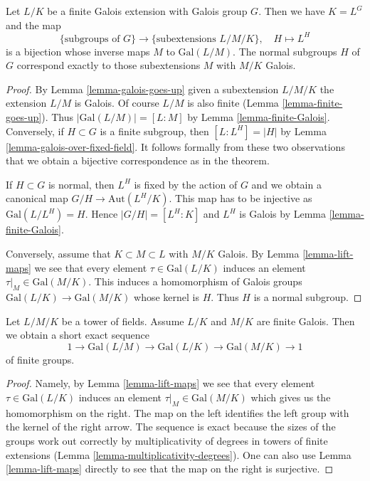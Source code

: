 \begin{theorem}
\label{theorem-galois-theory}
Let $L/K$ be a finite Galois extension with Galois group $G$.
Then we have $K = L^G$ and the map
$$
\{\text{subgroups of }G\}
\longrightarrow
\{\text{subextensions }L/M/K\},\quad
H \longmapsto L^H
$$
is a bijection whose inverse maps $M$ to $\text{Gal}(L/M)$.
The normal subgroups $H$ of $G$ correspond exactly to those
subextensions $M$ with $M/K$ Galois.
\end{theorem}

\begin{proof}
By Lemma \ref{lemma-galois-goes-up} given a subextension $L/M/K$
the extension $L/M$ is Galois. Of course $L/M$ is also finite
(Lemma \ref{lemma-finite-goes-up}). Thus $|\text{Gal}(L/M)| = [L : M]$
by Lemma \ref{lemma-finite-Galois}.
Conversely, if $H \subset G$ is a finite subgroup, then
$[L : L^H] = |H|$ by Lemma \ref{lemma-galois-over-fixed-field}.
It follows formally from these two observations that we obtain
a bijective correspondence as in the theorem.

\medskip\noindent
If $H \subset G$ is normal, then $L^H$ is fixed by the action of
$G$ and we obtain a canonical map $G/H \to \text{Aut}(L^H/K)$.
This map has to be injective as $\text{Gal}(L/L^H) = H$. Hence
$|G/H| = [L^H : K]$ and $L^H$ is Galois by
Lemma \ref{lemma-finite-Galois}.

\medskip\noindent
Conversely, assume that $K \subset M \subset L$ with $M/K$ Galois.
By Lemma \ref{lemma-lift-maps} we see that every
element $\tau \in \text{Gal}(L/K)$ induces an element
$\tau|_M \in \text{Gal}(M/K)$. This induces a homomorphism
of Galois groups $\text{Gal}(L/K) \to \text{Gal}(M/K)$ whose
kernel is $H$. Thus $H$ is a normal subgroup.
\end{proof}

\begin{lemma}
\label{lemma-ses-galois}
Let $L/M/K$ be a tower of fields. Assume $L/K$ and $M/K$ are finite Galois.
Then we obtain a short exact sequence
$$
1 \to \text{Gal}(L/M) \to \text{Gal}(L/K) \to \text{Gal}(M/K) \to 1
$$
of finite groups.
\end{lemma}

\begin{proof}
Namely, by Lemma \ref{lemma-lift-maps}
we see that every element $\tau \in \text{Gal}(L/K)$ induces an element
$\tau|_M \in \text{Gal}(M/K)$ which gives us the homomorphism on the
right. The map on the left identifies the left group with the kernel
of the right arrow. The sequence is exact because the sizes
of the groups work out correctly by multiplicativity of degrees
in towers of finite extensions
(Lemma \ref{lemma-multiplicativity-degrees}).
One can also use Lemma \ref{lemma-lift-maps}
directly to see that the map on the right is surjective.
\end{proof}






